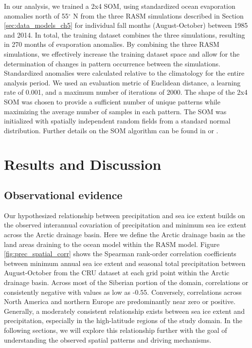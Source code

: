 In our analysis, we trained a 2x4 SOM, using standardized ocean evaporation anomalies north of 55$^{\circ}$ N from the three RASM simulations described in Section \ref{sec:data_models_ch5} for individual fall months (August-October) between 1985 and 2014.
In total, the training dataset combines the three simulations, resulting in 270 months of evaporation anomalies.
By combining the three RASM simulations, we effectively increase the training dataset space and allow for the determination of changes in pattern occurrence between the simulations.
Standardized anomalies were calculated relative to the climatology for the entire analysis period.
We used an evaluation metric of Euclidean distance, a learning rate of 0.001, and a maximum number of iterations of 2000.
The shape of the 2x4 SOM was chosen to provide a sufficient number of unique patterns while maximizing the average number of samples in each pattern.
The SOM was initialized with spatially independent random fields from a standard normal distribution.
Further details on the SOM algorithm can be found in \citet{Reusch_2005} or \citet{Cassano_2015}.

\section{Results and Discussion}
\label{sec:results_ch5}
\subsection{Observational evidence}
Our hypothesized relationship between precipitation and sea ice extent builds on the observed interannual covariation of precipitation and minimum sea ice extent across the Arctic drainage basin.
Here we define the Arctic drainage basin as the land areas draining to the ocean model within the RASM model.
Figure \ref{fig:prec_spatial_corr} shows the Spearman rank-order correlation coefficients between minimum annual sea ice extent and seasonal total precipitation between August-October from the CRU dataset at each grid point within the Arctic drainage basin.
Across most of the Siberian portion of the domain, correlations or consistently negative with values as low as -0.55.
Conversely, correlations across North America and northern Europe are predominantly near zero or positive.
Generally, a moderately consistent relationship exists between sea ice extent and precipitation, especially in the high-latitude regions of the study domain.
In the following sections, we will explore this relationship further with the goal of understanding the observed spatial patterns and driving mechanisms.

